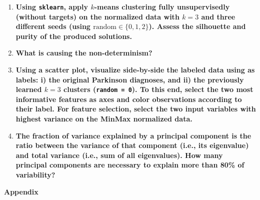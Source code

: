 \documentclass[12pt]{article}
\begin{document}
\begin{enumerate}[leftmargin=\labelsep,resume]

  \item \textbf{Using \texttt{sklearn}, apply $k$-means clustering fully unsupervisedly
          (without targets) on the normalized data with $k = 3$ and three different seeds
          (using $\text{random} \in \{0, 1, 2\}$). Assess the silhouette and purity of the produced solutions.}

  \item \textbf{What is causing the non-determinism?}

  \item \textbf{Using a scatter plot, visualize side-by-side the labeled data using as labels: i) the original
          Parkinson diagnoses, and ii) the previously learned $k = 3$ clusters (\texttt{random = 0}). To this end, select
          the two most informative features as axes and color observations according to their label. For feature
          selection, select the two input variables with highest variance on the MinMax normalized data.}

  \item \textbf{The fraction of variance explained by a principal component is the ratio between the
          variance of that component (i.e., its eigenvalue) and total variance (i.e., sum of all eigenvalues).
          How many principal components are necessary to explain more than 80\% of variability?}

\end{enumerate}

\pagebreak

\large{\textbf{Appendix}\vskip 0.3cm}


\end{document}
